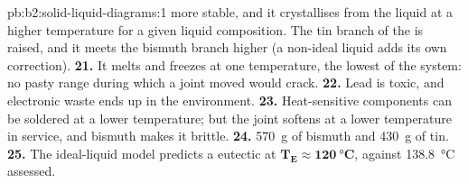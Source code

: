 \begin{solution}{pb:b2:solid-liquid-diagrams:1}
more stable, and it crystallises from the liquid at a higher temperature for a
given liquid composition. The tin branch of the  is raised, and it
meets the bismuth branch higher (a non-ideal liquid adds its own correction).
\textbf{21.} It melts and freezes at one temperature, the lowest of the system:
no pasty range during which a joint moved would crack.
\textbf{22.} Lead is toxic, and electronic waste ends up in the environment.
\textbf{23.} Heat-sensitive components can be soldered at a lower temperature;
but the joint softens at a lower temperature in service, and bismuth makes it
brittle.
\textbf{24.} \qty{570}{g} of bismuth and \qty{430}{g} of tin.
\textbf{25.} The ideal-liquid model predicts a eutectic at $\boldsymbol{T_E
\approx \qty{120}{\degreeCelsius}}$, against \qty{138.8}{\degreeCelsius}
assessed.
\end{solution}
